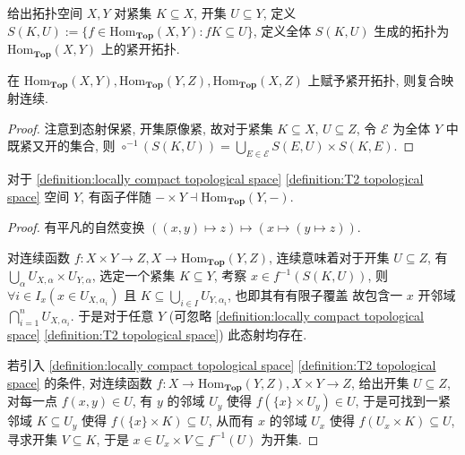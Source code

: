 \begin{definition}[紧开拓扑]
    \label {definition:compact-open topology}
    给出拓扑空间 \(X,Y\) 对紧集 \(K \subseteq X\), 开集 \(U \subseteq Y\),
    定义 \(S(K,U) := \{f \in \mathrm{Hom}_{\mathbf{Top}} (X,Y) : f K \subseteq U\}\),
    定义全体 \(S(K,U)\) 生成的拓扑为 \(\mathrm{Hom}_{\mathbf{Top}} (X,Y)\) 上的紧开拓扑.
\end{definition}

\begin{corollary}
    在 \(\mathrm{Hom}_{\mathbf{Top}} (X,Y), \mathrm{Hom}_{\mathbf{Top}} (Y,Z),\mathrm{Hom}_{\mathbf{Top}} (X,Z)\) 上赋予紧开拓扑, 则复合映射连续.

    \begin{proof}
        注意到态射保紧, 开集原像紧, 故对于紧集 \(K \subseteq X\), \(U \subseteq Z\), 令 \(\mathcal{E}\) 为全体 \(Y\) 中既紧又开的集合,
        则 \(\circ^{-1} (S(K,U)) = \bigcup_{E \in \mathcal{E}} S(E,U) \times S(K,E)\).
    \end{proof}
\end{corollary}

\begin{theorem}[乘积 - 指数伴随]
    对于 \ref{definition:locally compact topological space} \ref{definition:T2 topological space} 空间 \(Y\),
    有函子伴随 \(- \times Y \dashv \mathrm{Hom}_{\mathbf{Top}} (Y, -)\).

    \begin{proof}
        有平凡的自然变换 \(((x,y) \mapsto z) \mapsto (x \mapsto (y \mapsto z))\).

        对连续函数 \(f : X \times Y \to Z, X \to \mathrm{Hom}_{\mathbf{Top}} (Y,Z)\), 连续意味着对于开集 \(U \subseteq Z\), 有 \(\bigcup_\alpha U_{X,\alpha} \times U_{Y,\alpha}\),
        选定一个紧集 \(K \subseteq Y\), 考察 \(x \in f^{-1}(S(K,U))\), 则 \(\forall i \in I_x (x \in U_{X,\alpha_i})\) 且 \(K \subseteq \bigcup_{i \in I} U_{Y,\alpha_i}\), 也即其有有限子覆盖
        故包含一 \(x\) 开邻域 \(\bigcap_{i=1}^n U_{X,\alpha_i}\). 于是对于任意 \(Y\) (可忽略 \ref{definition:locally compact topological space} \ref{definition:T2 topological space}) 此态射均存在.

        若引入 \ref{definition:locally compact topological space} \ref{definition:T2 topological space} 的条件, 对连续函数 \(f : X \to \mathrm{Hom}_{\mathbf{Top}} (Y,Z), X \times Y \to Z\), 
        给出开集 \(U \subseteq Z\), 对每一点 \(f(x,y) \in U\), 有 \(y\) 的邻域 \(U_y\) 使得 \(f(\{x\} \times U_y) \in U\), 于是可找到一紧邻域 \(K \subseteq U_y\) 使得 \(f(\{x\} \times K) \subseteq U\),
        从而有 \(x\) 的邻域 \(U_x\) 使得 \(f(U_x \times K) \subseteq U\), 寻求开集 \(V \subseteq K\), 于是 \(x \in U_x \times V \subseteq f^{-1} (U)\) 为开集.
    \end{proof}
\end{theorem}

